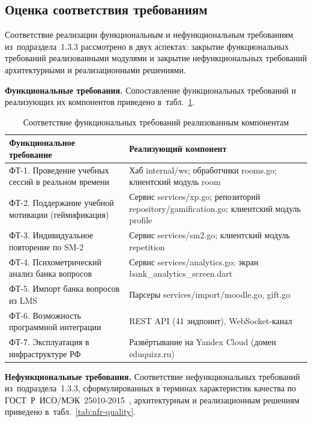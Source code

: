\subsection{Оценка соответствия требованиям}

Соответствие реализации функциональным и нефункциональным
требованиям из~подраздела~1.3.3 рассмотрено в двух аспектах:
закрытие функциональных требований реализованными модулями
и закрытие нефункциональных требований архитектурными и
реализационными решениями.

\textbf{Функциональные требования.} Сопоставление функциональных
требований и реализующих их компонентов приведено
в~табл.~\ref{tab:fr-implementation}.

\begin{table}[!htb]
\fontsize{11pt}{13pt}\selectfont
\centering
\caption{Соответствие функциональных требований реализованным компонентам}
\label{tab:fr-implementation}
\smallskip
\begin{tabular}{|p{5.0cm}|p{8.0cm}|}
    \hline
    \textbf{Функциональное требование} & \textbf{Реализующий компонент} \\
    \hline
        ФТ-1. Проведение учебных сессий в реальном времени & Хаб internal/ws; обработчики rooms.go; клиентский модуль room \\
    \hline
        ФТ-2. Поддержание учебной мотивации (геймификация) & Сервис services/xp.go; репозиторий repository/gamification.go; клиентский модуль profile \\
    \hline
        ФТ-3. Индивидуальное повторение по SM-2 & Сервис services/sm2.go; клиентский модуль repetition \\
    \hline
        ФТ-4. Психометрический анализ банка вопросов & Сервис services/analytics.go; экран bank\_analytics\_screen.dart \\
    \hline
        ФТ-5. Импорт банка вопросов из LMS & Парсеры services/import/moodle.go, gift.go \\
    \hline
        ФТ-6. Возможность программной интеграции & REST API (41 эндпоинт), WebSocket-канал \\
    \hline
        ФТ-7. Эксплуатация в инфраструктуре РФ & Развёртывание на Yandex Cloud (домен eduquizz.ru) \\
    \hline
\end{tabular}
\end{table}
\FloatBarrier

\textbf{Нефункциональные требования.} Соответствие нефункциональных
требований из~подраздела~1.3.3, сформулированных в терминах
характеристик качества по ГОСТ~Р~ИСО/МЭК~25010-2015~\cite{gost25010},
архитектурным и реализационным решениям приведено
в~табл.~\ref{tab:nfr-quality}.

